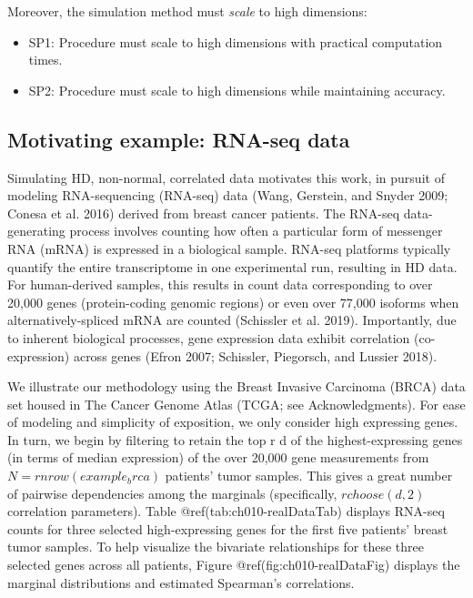 \documentclass{article}
\begin{document}
Moreover, the simulation method must \emph{scale} to high dimensions:

\begin{itemize}
\tightlist
\item
  SP1: Procedure must scale to high dimensions with practical
  computation times.
\item
  SP2: Procedure must scale to high dimensions while maintaining
  accuracy.
\end{itemize}

\hypertarget{motivating-example-rna-seq-data}{%
\subsection{Motivating example: RNA-seq
data}\label{motivating-example-rna-seq-data}}

Simulating HD, non-normal, correlated data motivates this work, in
pursuit of modeling RNA-sequencing (RNA-seq) data (Wang, Gerstein, and
Snyder 2009; Conesa et al. 2016) derived from breast cancer patients.
The RNA-seq data-generating process involves counting how often a
particular form of messenger RNA (mRNA) is expressed in a biological
sample. RNA-seq platforms typically quantify the entire transcriptome in
one experimental run, resulting in HD data. For human-derived samples,
this results in count data corresponding to over 20,000 genes
(protein-coding genomic regions) or even over 77,000 isoforms when
alternatively-spliced mRNA are counted (Schissler et al. 2019).
Importantly, due to inherent biological processes, gene expression data
exhibit correlation (co-expression) across genes (Efron 2007; Schissler,
Piegorsch, and Lussier 2018).

We illustrate our methodology using the Breast Invasive Carcinoma (BRCA)
data set housed in The Cancer Genome Atlas (TCGA; see Acknowledgments).
For ease of modeling and simplicity of exposition, we only consider high
expressing genes. In turn, we begin by filtering to retain the top r d
of the highest-expressing genes (in terms of median expression) of the
over 20,000 gene measurements from \(N=r nrow(example_brca)\) patients'
tumor samples. This gives a great number of pairwise dependencies among
the marginals (specifically, \(r choose(d,2)\) correlation parameters).
Table @ref(tab:ch010-realDataTab) displays RNA-seq counts for three
selected high-expressing genes for the first five patients' breast tumor
samples. To help visualize the bivariate relationships for these three
selected genes across all patients, Figure @ref(fig:ch010-realDataFig)
displays the marginal distributions and estimated Spearman's
correlations.
\end{document}
